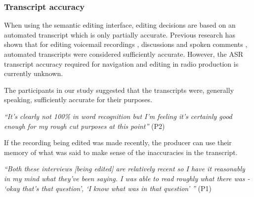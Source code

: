 





\subsubsection{Transcript accuracy}
When using the semantic editing interface, editing decisions are based on an
automated transcript which is only partially accurate. Previous research has shown that for editing
voicemail recordings \citep{Whittaker2004}, discussions \citep{Sivaraman2016} and spoken comments \citep{Yoon2014},
automated transcripts were considered sufficiently accurate. However, the ASR transcript accuracy required for
navigation and editing in radio production is currently unknown.

The participants in our study suggested that the transcripts were, generally speaking, sufficiently accurate for their
purposes.

\textit{``It's clearly not 100\% in word recognition but I'm feeling it's
  certainly good enough for my rough cut purposes at this point''} (P2)

If the recording being edited was made recently, the producer can use their
memory of what was said to make sense of the inaccuracies in the
transcript.

\textit{``Both these interviews [being edited] are relatively recent so I have
  it reasonably in my mind what they've been saying. I was able to read roughly
  what there was - `okay that's that question', `I know what was in that
  question' ''} (P1)

